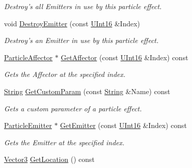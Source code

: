 \begin{DoxyCompactItemize}
\begin{DoxyCompactList}\small\item\em Destroy's all Emitters in use by this particle effect. \item\end{DoxyCompactList}\item 
void \hyperlink{classMezzanine_1_1ParticleEffect_a00195054c7c949038a083be943876e28}{DestroyEmitter} (const \hyperlink{namespaceMezzanine_a1b6c09063432c7ddd87011c88306c767}{UInt16} \&Index)
\begin{DoxyCompactList}\small\item\em Destroy's an Emitter in use by this particle effect. \item\end{DoxyCompactList}\item 
\hyperlink{classMezzanine_1_1ParticleAffector}{ParticleAffector} $\ast$ \hyperlink{classMezzanine_1_1ParticleEffect_a401836904a0426be484bcecb33447b6c}{GetAffector} (const \hyperlink{namespaceMezzanine_a1b6c09063432c7ddd87011c88306c767}{UInt16} \&Index) const 
\begin{DoxyCompactList}\small\item\em Gets the Affector at the specified index. \item\end{DoxyCompactList}\item 
\hyperlink{namespaceMezzanine_acf9fcc130e6ebf08e3d8491aebcf1c86}{String} \hyperlink{classMezzanine_1_1ParticleEffect_adce2efc1c8e866459db8438454483dc4}{GetCustomParam} (const \hyperlink{namespaceMezzanine_acf9fcc130e6ebf08e3d8491aebcf1c86}{String} \&Name) const 
\begin{DoxyCompactList}\small\item\em Gets a custom parameter of a particle effect. \item\end{DoxyCompactList}\item 
\hyperlink{classMezzanine_1_1ParticleEmitter}{ParticleEmitter} $\ast$ \hyperlink{classMezzanine_1_1ParticleEffect_ada183314f9c8ed055fee5901b1d30739}{GetEmitter} (const \hyperlink{namespaceMezzanine_a1b6c09063432c7ddd87011c88306c767}{UInt16} \&Index) const 
\begin{DoxyCompactList}\small\item\em Gets the Emitter at the specified index. \item\end{DoxyCompactList}\item 
\hyperlink{classMezzanine_1_1Vector3}{Vector3} \hyperlink{classMezzanine_1_1ParticleEffect_a45174a2138b031322ddc57fe1be006de}{GetLocation} () const 

\end{DoxyCompactItemize}
